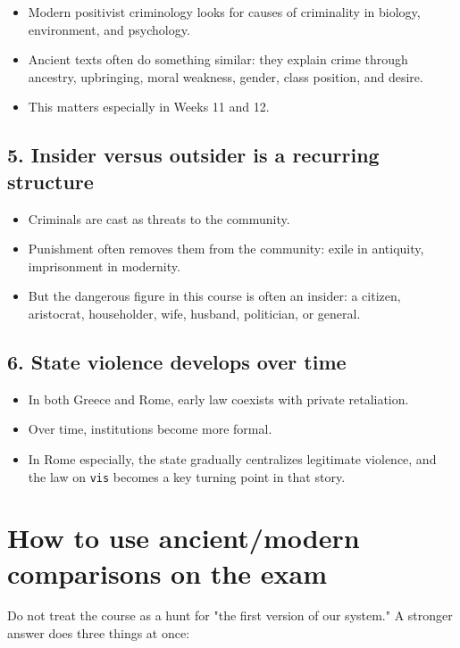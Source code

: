 \documentclass[11pt]{article}
\begin{document}
\begin{itemize}
\item Modern positivist criminology looks for causes of criminality in biology, environment, and psychology.
\item Ancient texts often do something similar: they explain crime through ancestry, upbringing, moral weakness, gender, class position, and desire.
\item This matters especially in Weeks 11 and 12.
\end{itemize}

\subsection{5. Insider versus outsider is a recurring structure}

\begin{itemize}
\item Criminals are cast as threats to the community.
\item Punishment often removes them from the community: exile in antiquity, imprisonment in modernity.
\item But the dangerous figure in this course is often an insider: a citizen, aristocrat, householder, wife, husband, politician, or general.
\end{itemize}

\subsection{6. State violence develops over time}

\begin{itemize}
\item In both Greece and Rome, early law coexists with private retaliation.
\item Over time, institutions become more formal.
\item In Rome especially, the state gradually centralizes legitimate violence, and the law on \texttt{vis} becomes a key turning point in that story.
\end{itemize}

\section{How to use ancient/modern comparisons on the exam}

Do not treat the course as a hunt for "the first version of our system." A stronger answer does three things at once:
\end{document}
